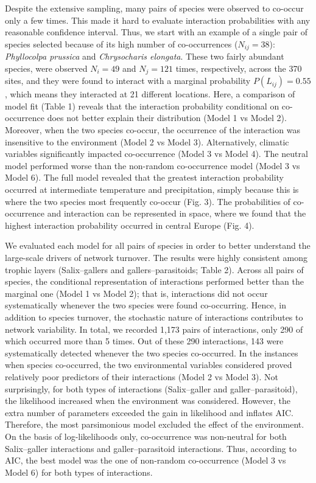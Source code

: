 \documentclass[12pt]{article}
\begin{document}
Despite the extensive sampling, many pairs of species were observed to co-occur
only a few times. This made it hard to evaluate interaction probabilities with
any reasonable confidence interval. Thus, we start with an example of a single
pair of species selected because of its high number of co-occurrences
($N_{ij}=38$): \textit{Phyllocolpa prussica} and \textit{Chrysocharis
elongata}. These two fairly abundant species, were observed $N_i=49$ and $N_j=121$
times, respectively, across the 370 sites, and they were found to
interact with a marginal probability $P(L_{ij})=0.55$, which means they
interacted at 21 different locations. Here, a comparison of model fit (Table
1) reveals that the interaction probability conditional on co-occurrence
does not better explain their distribution (Model 1 vs Model 2). Moreover, when the two
species co-occur, the occurrence of the interaction was insensitive to the
environment (Model 2 vs Model 3). Alternatively, climatic variables
significantly impacted co-occurrence (Model 3 vs Model 4). The neutral model
performed worse than the non-random co-occurrence model (Model 3 vs Model 6).
The full model revealed that the greatest interaction probability occurred at
intermediate temperature and precipitation, simply because this is where the
two species most frequently co-occur (Fig. 3). The probabilities of co-occurrence
and interaction can be represented in space, where we found that the
highest interaction probability occurred in central Europe (Fig. 4).

We evaluated each model for all pairs of species in order to better understand
the large-scale drivers of network turnover. The results were highly consistent
among trophic layers (Salix–gallers and gallers–parasitoids; Table 2). Across
all pairs of species, the conditional representation of interactions performed
better than the marginal one (Model 1 vs Model 2); that is, interactions did
not occur systematically whenever the two species were found co-occurring.
Hence, in addition to species turnover, the stochastic nature of interactions
contributes to network variability. In total, we recorded 1,173 pairs of
interactions, only 290 of which occurred more than 5 times. Out of these 290
interactions, 143 were systematically detected whenever the two species co-occurred.
In the instances when species co-occurred, the two environmental
variables considered proved relatively poor predictors of their interactions
(Model 2 vs Model 3). Not surprisingly, for both types of interactions
(Salix–galler and galler–parasitoid), the likelihood increased when the
environment was considered. However, the extra number of parameters exceeded the
gain in likelihood and inflates AIC. Therefore, the most parsimonious model
excluded the effect of the environment. On the basis of log-likelihoods only,
co-occurrence was non-neutral for both Salix–galler interactions and
galler–parasitoid interactions. Thus, according to AIC, the best model was the
one of non-random co-occurrence (Model 3 vs Model 6) for both types of
interactions.
\end{document}
